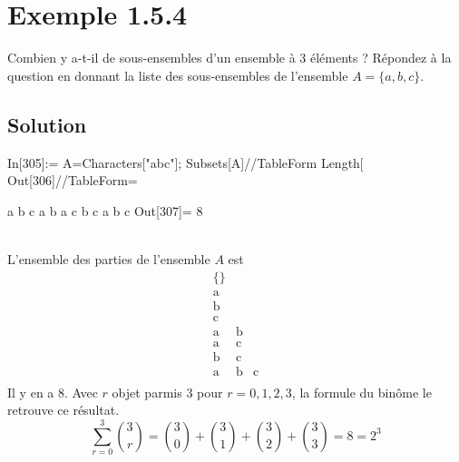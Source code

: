 \section*{Exemple 1.5.4}
Combien y a-t-il de sous-ensembles d'un ensemble à 3 éléments ? Répondez à la question en donnant la liste des sous-ensembles de l'ensemble $A = \{a, b, c\}$.
\subsection*{Solution}
\begin{multicols}{2}
\begin{verbbox}
In[305]:= A=Characters["abc"];
Subsets[A]//TableForm
Length[%
Out[306]//TableForm=
	
a		
b		
c		
a	b	
a	c	
b	c	
a	b	c
Out[307]= 8
\end{verbbox}
	\theverbbox
	\columnbreak
	\\
	L'ensemble des parties de l'ensemble $A$ est
	\begin{equation*}
		\begin{array}{ccc}
		\{\} &  &  \\
		\text{a} & \text{} & \text{} \\
		\text{b} & \text{} & \text{} \\
		\text{c} & \text{} & \text{} \\
		\text{a} & \text{b} & \text{} \\
		\text{a} & \text{c} & \text{} \\
		\text{b} & \text{c} & \text{} \\
		\text{a} & \text{b} & \text{c} \\
		\end{array}%
	\end{equation*}
	Il y en a 8. Avec $r$ objet parmis $3$ pour $r=0,1,2,3$, la formule du binôme le retrouve ce résultat.  
	\[\sum_{r=0}^3\binom{3}{r}=\binom{3}{0}+\binom{3}{1}+\binom{3}{2}+\binom{3}{3}=8=2^3\] 
\end{multicols}